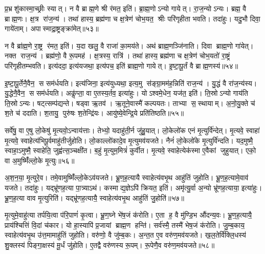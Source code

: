 प्र॒भ्रशु॑कास्मा॒च्छ्रीः स्यात्।
न वै ब्राह्म॒णे श्री र॑मत॒ इति॑।
ब्रा॒ह्म॒णोऽन्यो गायेत्।
रा॒ज॒न्योऽन्यः।
ब्रह्म॒ वै ब्राह्म॒णः।
क्ष॒त्र रा॑ज॒न्य॑।
तथा॑ हास्य॒ ब्रह्म॑णा च क्ष॒त्रेण॑ चोभ॒यत॒ श्रीः परि॑गृहीता भवति।
तदा॑हुः।
यदु॒भौ दिवा॒ गाये॑ताम्।
अपास्माद्रा॒ष्ट्रङ्क्रा॑मेत्॥५३॥

न वै ब्रा॑ह्म॒णे रा॒ष्ट्र र॑मत॒ इति॑।
य॒दा खलु॒ वै राजा॑ का॒मय॑ते।
अथ॑ ब्राह्म॒णञ्जि॑नाति।
दिवा ब्राह्म॒णो गा॑येत्।
नक्त राज॒न्य॑।
ब्रह्म॑णो॒ वै रू॒पमह॑।
क्ष॒त्रस्य॒ रात्रि॑।
तथा॑ हास्य॒ ब्रह्म॑णा च क्ष॒त्रेण॑ चोभ॒यतो॑ रा॒ष्ट्रं परि॑गृहीतम्भवति।
इत्य॑ददा॒ इत्य॑यजथा॒ इत्य॑पच॒ इति॑ ब्राह्म॒णो गायेत्।
इ॒ष्टा॒पू॒र्तं वै ब्राह्म॒णस्य॑॥५४॥

इ॒ष्टा॒पू॒र्तेनै॒वैन॒ स सम॑र्धयति।
इत्य॑जिना॒ इत्य॑युध्यथा॒ इत्य॒मु स॑ङ्ग्रा॒मम॑ह॒न्निति॑ राज॒न्य॑।
यु॒द्धं वै रा॑ज॒न्य॑स्य।
यु॒द्धेनै॒वैन॒ स सम॑र्धयति।
अकॢ॑प्ता॒ वा ए॒तस्य॒र्तव॒ इत्या॑हुः।
योऽश्वमे॒धेन॒ यज॑त॒ इति॑।
ति॒स्रोऽन्यो गाय॑ति ति॒स्रोऽन्यः।
षट्त्सम्प॑द्यन्ते।
षड्वा ऋ॒तव॑।
ऋ॒तूने॒वास्मै॑ कल्पयतः।
ताभ्या स॒स्थायाम्।
अ॒नो॒यु॒क्ते च॑ श॒ते च॑ ददाति।
श॒तायु॒ पुरु॑षः श॒तेन्द्रि॑यः।
आयु॑ष्ये॒वेन्द्रि॒ये प्रति॑तिष्ठति॥५५॥\anuvakamend[गाये॑ताङ्क्रामेद्ब्राह्म॒णस्य॑ कल्पयतश्च॒त्वारि॑ च]

सर्वे॑षु॒ वा ए॒षु लो॒केषु॑ मृ॒त्यवो॒ऽन्वाय॑त्ताः।
तेभ्यो॒ यदाहु॑ती॒र्न जु॑हु॒यात्।
लो॒केलो॑क एनं मृ॒त्युर्वि॑न्देत्।
मृ॒त्यवे॒ स्वाहा॑ मृ॒त्यवे॒ स्वाहेत्य॑भिपू॒र्वमाहु॑तीर्जुहोति।
लो॒काल्लो॑कादे॒व मृ॒त्युमव॑यजते।
नैनं॑ लो॒केलो॑के मृ॒त्युर्वि॑न्दति।
यद॒मुष्मै॒ स्वाहा॒ऽमुष्मै॒ स्वाहेति॒ जुह्व॑त्स॒ञ्चक्षी॑त।
ब॒हुं मृ॒त्युम॒मित्रं॑ कुर्वीत।
मृ॒त्यवे॒ स्वाहेत्येक॑स्मा ए॒वैकां जुहुयात्।
एको॒ वा अ॒मुष्मिँ॑ल्लो॒के मृ॒त्युः॥५६॥

अ॒श॒न॒या॒ मृ॒त्युरे॒व।
तमे॒वामुष्मिँ॑ल्लो॒केऽव॑यजते।
भ्रू॒ण॒ह॒त्यायै स्वाहेत्य॑वभृ॒थ आहु॑तिं जुहोति।
भ्रू॒ण॒ह॒त्यामे॒वाव॑ यजते।
तदा॑हुः।
यद्भ्रू॑णह॒त्या पा॒त्र्याऽथ॑।
कस्माद्य॒ज्ञेऽपि॑ क्रियत॒ इति॑।
अमृ॑त्यु॒र्वा अ॒न्यो भ्रू॑णह॒त्याया॒ इत्या॑हुः।
भ्रू॒ण॒ह॒त्या वाव मृ॒त्युरिति॑।
यद्भ्रू॑णह॒त्यायै॒ स्वाहेत्य॑वभृ॒थ आहु॑तिं जु॒होति॑॥५७॥

मृ॒त्युमे॒वाहु॑त्या तर्पयि॒त्वा प॑रि॒पाणं॑ कृ॒त्वा।
भ्रू॒ण॒घ्ने भे॑ष॒जं क॑रोति।
ए॒ता ह॒ वै मु॑ण्डि॒भ औ॑दन्य॒वः।
भ्रू॒ण॒ह॒त्यायै॒ प्राय॑श्चित्तिं वि॒दां च॑कार।
यो हा॒स्यापि॑ प्र॒जायां ब्राह्म॒ण हन्ति॑।
सर्व॑स्मै॒ तस्मै॑ भेष॒जं क॑रोति।
जु॒म्ब॒काय॒ स्वाहेत्य॑वभृ॒थ उ॑त्त॒मामाहु॑तिं जुहोति।
वरु॑णो॒ वै जु॑म्ब॒कः।
अ॒न्त॒त ए॒व वरु॑ण॒मव॑यजते।
ख॒ल॒तेर्वि॑क्लि॒धस्य॑ शु॒क्लस्य॑ पिङ्गा॒क्षस्य॑ मू॒र्धं जु॑होति।
ए॒तद्वै वरु॑णस्य रू॒पम्।
रू॒पेणै॒व वरु॑ण॒मव॑यजते॥५८॥\anuvakamend[लो॒के मृ॒त्युर्जु॒होति॑ मू॒र्धं जु॑होति॒ द्वे च॑]


